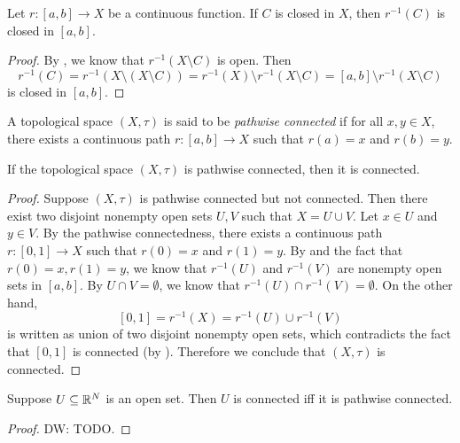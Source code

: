 \documentclass{techreport}
\newcommand{\diw}[1]{{\color{Red} DW: #1}}
\begin{document}
\begin{proposition}\label{Prop:ContinuousReverseClosedIsClosed}
	Let $r : [a,b] \to X$ be a continuous function.
	If $C$ is closed in $X$, then $r^{-1}(C)$ is closed in $[a,b]$.
\end{proposition}
\begin{proof}
	By , we know that $r^{-1}(X \setminus C)$ is open.
	Then
	\[
	r^{-1}(C) = r^{-1}(X \setminus (X \setminus C)) = r^{-1}(X) \setminus r^{-1}(X \setminus C) = [a,b] \setminus r^{-1}(X\setminus C)
	\]
	is closed in $[a,b]$.
\end{proof}

\begin{definition}\label{De:PathwiseConnected}
	A topological space $(X,\tau)$ is said to be \emph{pathwise connected} if for all $x,y \in X$, there exists a continuous path $r : [a,b] \to X$ such that $r(a) =x$ and $r(b)=y$.
\end{definition}

\begin{proposition}\label{Prop:PathWiseConnImplyConn}
	If the topological space $(X,\tau)$ is pathwise connected, then it is connected.
\end{proposition}
\begin{proof}
	Suppose $(X,\tau)$ is pathwise connected but not connected.
	Then there exist two disjoint nonempty open sets $U,V$ such that $X = U \cup V$.
	Let $x \in U$ and $y \in V$.
	By the pathwise connectedness, there exists a continuous path $r : [0,1] \to X$ such that $r(0)=x$ and $r(1)=y$.
	By  and the fact that $r(0)=x,r(1)=y$, we know that $r^{-1}(U)$ and $r^{-1}(V)$ are nonempty open sets in $[a,b]$.
	By $U \cap V = \emptyset$, we know that $r^{-1}(U) \cap r^{-1}(V) = \emptyset$.
	On the other hand,
	\[
	[0,1] = r^{-1}(X) = r^{-1}(U) \cup r^{-1}(V)
	\]
	is written as union of two disjoint nonempty open sets, which contradicts the fact that $[0,1]$ is connected (by ).
	Therefore we conclude that $(X,\tau)$ is connected.
\end{proof}

\begin{proposition}\label{Prop:OpenSetInEuclideanSpaceConn}
	Suppose $U \subseteq \mathbb{R}^N$ is an open set.
	Then $U$ is connected iff it is pathwise connected.
\end{proposition}
\begin{proof}
	\diw{TODO.}
\end{proof}
\end{document}
